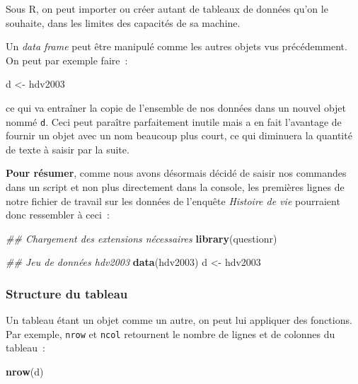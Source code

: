 \documentclass[
  12pt,
]{book}
\makeatletter
\newenvironment{Shaded}{\begin{snugshade}}{\end{snugshade}}
\newcommand{\CommentTok}[1]{\textcolor[rgb]{0.56,0.35,0.01}{\textit{#1}}}
\newcommand{\KeywordTok}[1]{\textcolor[rgb]{0.13,0.29,0.53}{\textbf{#1}}}
\newcommand{\NormalTok}[1]{#1}
\newcommand{\StringTok}[1]{\textcolor[rgb]{0.31,0.60,0.02}{#1}}
\newenvironment{kframe}{%
\medskip{}
\setlength{\fboxsep}{.8em}
\def\at@end@of@kframe{}%
\ifinner\ifhmode%
 \def\at@end@of@kframe{\end{minipage}}%
 \begin{minipage}{\columnwidth}%
\fi\fi%
\def\FrameCommand##1{\hskip\@totalleftmargin \hskip-\fboxsep
\colorbox{incolor}{##1}\hskip-\fboxsep
    \hskip-\linewidth \hskip-\@totalleftmargin \hskip\columnwidth}%
\MakeFramed {\advance\hsize-\width
  \@totalleftmargin\z@ \linewidth\hsize
  \@setminipage}}%
{\par\unskip\endMakeFramed%
\at@end@of@kframe}
\newenvironment{rmdblock}[1]
 {
 \begin{itemize}
 \renewcommand{\labelitemi}{
   \raisebox{-.7\height}[0pt][0pt]{
     {\setkeys{Gin}{width=3em,keepaspectratio}\texttt{[image: images/\#1]}}
   }
 }
 \begin{kframe}
 \setlength{\fboxsep}{1em}
 \item
 }
 {
 \end{kframe}
 \end{itemize}
 }
\newenvironment{rmdnote}
  {\begin{rmdblock}{note}}
  {\end{rmdblock}}
\makeatother
\begin{document}
\begin{rmdnote}
Sous R, on peut importer ou créer autant de tableaux de données qu'on le souhaite, dans les limites des capacités de sa machine.
\end{rmdnote}

Un \emph{data frame} peut être manipulé comme les autres objets vus précédemment. On peut par exemple faire~:

\begin{Shaded}
\begin{Highlighting}[]
\NormalTok{d \textless{}{-}}\StringTok{ }\NormalTok{hdv2003}
\end{Highlighting}
\end{Shaded}

ce qui va entraîner la copie de l'ensemble de nos données dans un nouvel objet nommé \texttt{d}. Ceci peut paraître parfaitement inutile mais a en fait l'avantage de fournir un objet avec un nom beaucoup plus court, ce qui diminuera la quantité de texte à saisir par la suite.

\textbf{Pour résumer}, comme nous avons désormais décidé de saisir nos commandes dans un script et non plus directement dans la console, les premières lignes de notre fichier de travail sur les données de l'enquête \emph{Histoire de vie} pourraient donc ressembler à ceci~:

\begin{Shaded}
\begin{Highlighting}[]
\CommentTok{\#\# Chargement des extensions nécessaires}
\KeywordTok{library}\NormalTok{(questionr)}

\CommentTok{\#\# Jeu de données hdv2003}
\KeywordTok{data}\NormalTok{(hdv2003)}
\NormalTok{d \textless{}{-}}\StringTok{ }\NormalTok{hdv2003}
\end{Highlighting}
\end{Shaded}

\hypertarget{structure-du-tableau}{%
\subsubsection{Structure du tableau}\label{structure-du-tableau}}

Un tableau étant un objet comme un autre, on peut lui appliquer des fonctions. Par exemple, \texttt{nrow} et \texttt{ncol} retournent le nombre de lignes et de colonnes du tableau~:

\begin{Shaded}
\begin{Highlighting}[]
\KeywordTok{nrow}\NormalTok{(d)}
\end{Highlighting}
\end{Shaded}
\end{document}

